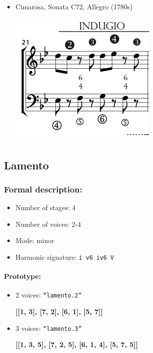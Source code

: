 ﻿\documentclass[11pt, openany]{article}
\begin{document}
\begin{itemize}
\begin{itemize}
\begin{center}
\end{center}
\item Cimarosa, Sonata C72, Allegro (1780s)
\begin{center}
\includegraphics[scale=0.5]{cimarosa72.png}
\end{center}
\end{itemize}


	\subsection{Lamento}
	
\subsubsection{Formal description:}
\begin{itemize}
\item Number of stages: 4
\item Number of voices: 2-4
\item Mode: minor
\item Harmonic signature: \texttt{i v6 iv6 V}
\end{itemize}

\paragraph{Prototype:}
\begin{itemize}
\item 2 voices: \texttt{“lamento.2”}
	\begin{center}
	\textbf{[[1, 3], [7, 2], [6, 1], [5, 7]]}
	\end{center}
\item 3 voices: \texttt{“lamento.3”}
	\begin{center}
	\textbf{[[1, 3, 5], [7, 2, 5], [6, 1, 4], [5, 7, 5]]}
	\end{center}
\end{itemize}


\end{itemize}
\end{document}

